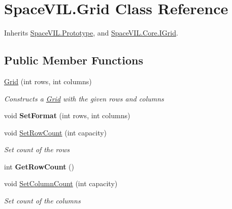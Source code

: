 \hypertarget{class_space_v_i_l_1_1_grid}{}\section{Space\+V\+I\+L.\+Grid Class Reference}
\label{class_space_v_i_l_1_1_grid}


Inherits \mbox{\hyperlink{class_space_v_i_l_1_1_prototype}{Space\+V\+I\+L.\+Prototype}}, and \mbox{\hyperlink{interface_space_v_i_l_1_1_core_1_1_i_grid}{Space\+V\+I\+L.\+Core.\+I\+Grid}}.

\subsection*{Public Member Functions}
\begin{DoxyCompactItemize}
\item 
\mbox{\hyperlink{class_space_v_i_l_1_1_grid_a43f2e279b402d3f37abaf7407cb10359}{Grid}} (int rows, int columns)
\begin{DoxyCompactList}\small\item\em Constructs a \mbox{\hyperlink{class_space_v_i_l_1_1_grid}{Grid}} with the given rows and columns \end{DoxyCompactList}\item 
\mbox{\label{class_space_v_i_l_1_1_grid_aec0c6b809ef355c95f2fbbd7608a8f2e}} 
void {\bfseries Set\+Format} (int rows, int columns)
\item 
void \mbox{\hyperlink{class_space_v_i_l_1_1_grid_a62b1f61a50a5cceefcee8c881f92e641}{Set\+Row\+Count}} (int capacity)
\begin{DoxyCompactList}\small\item\em Set count of the rows \end{DoxyCompactList}\item 
\mbox{\label{class_space_v_i_l_1_1_grid_a0306b68151d5d100ac90d298fcd67b6f}} 
int {\bfseries Get\+Row\+Count} ()
\item 
void \mbox{\hyperlink{class_space_v_i_l_1_1_grid_a601c091730701ac3e117396686c9904d}{Set\+Column\+Count}} (int capacity)
\begin{DoxyCompactList}\small\item\em Set count of the columns \end{DoxyCompactList}\item 
\mbox{\label{class_space_v_i_l_1_1_grid_a60c46214dcaaaf36ea21ebf29dcba72a}} 

\end{DoxyCompactItemize}
